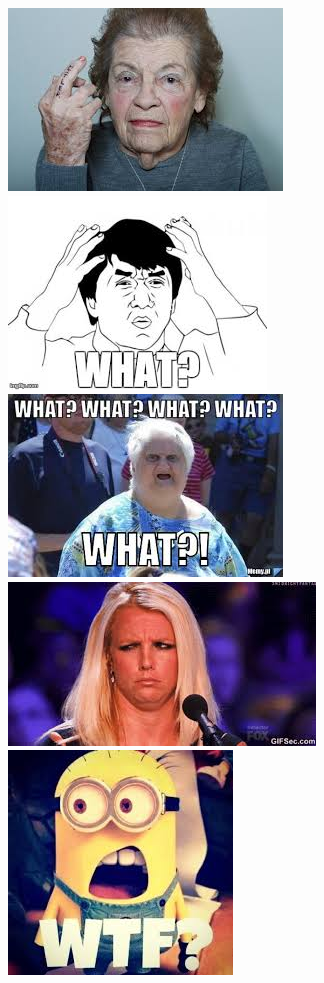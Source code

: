 \documentclass{42}
\begin{document}
\begin{center}
	\includegraphics[scale=0.35]{what1}
	\includegraphics[scale=0.35]{what2}
	\includegraphics[scale=0.35]{what3}
	\includegraphics[scale=0.35]{what4}
	\includegraphics[scale=0.35]{what5}

\end{center}
\end{document}
